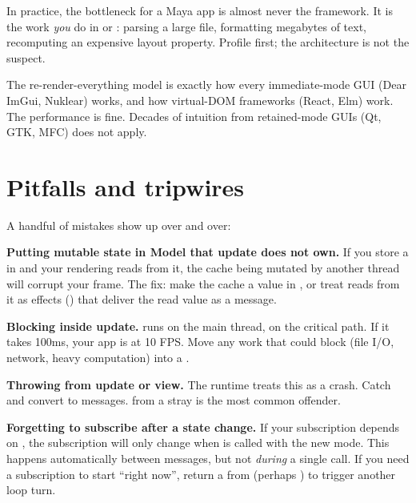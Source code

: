 In practice, the bottleneck for a Maya app is almost never the
framework. It is the work \emph{you} do in  or
: parsing a large file, formatting megabytes of text,
recomputing an expensive layout property. Profile first; the
architecture is not the suspect.

\begin{aside}
The re-render-everything model is exactly how every immediate-mode
GUI (Dear ImGui, Nuklear) works, and how virtual-DOM frameworks
(React, Elm) work. The performance is fine. Decades of intuition
from retained-mode GUIs (Qt, GTK, MFC) does not apply.
\end{aside}

\section{Pitfalls and tripwires}

A handful of mistakes show up over and over:

\begin{warning}
\textbf{Putting mutable state in Model that update does not own.}
If you store a  in  and
your rendering reads from it, the cache being mutated by another
thread will corrupt your frame. The fix: make the cache a value
in , or treat reads from it as effects ()
that deliver the read value as a message.
\end{warning}

\begin{warning}
\textbf{Blocking inside update.}  runs on the main
thread, on the critical path. If it takes 100ms, your app is at
10 FPS. Move any work that could block (file I/O, network, heavy
computation) into a .
\end{warning}

\begin{warning}
\textbf{Throwing from update or view.} The runtime treats this as
a crash. Catch and convert to messages. 
from a stray  is the most common offender.
\end{warning}

\begin{warning}
\textbf{Forgetting to subscribe after a state change.} If your
subscription depends on , the subscription will
only change when  is called with the new
mode. This happens automatically between messages, but not
\emph{during} a single  call. If you need a
subscription to start ``right now'', return a  from
 (perhaps ) to trigger
another loop turn.
\end{warning}

